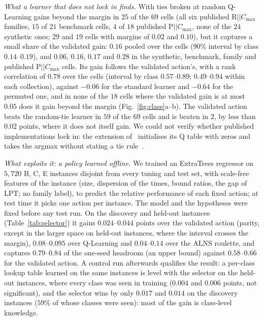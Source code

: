 \documentclass[conference,a4paper]{IEEEtran}
\newcommand{\Cmax}{C_{\max}}
\begin{document}
\emph{What a learner that does not lock in finds.} With ties broken at random Q-Learning gains beyond the margin in $25$ of the $69$ cells (all six published R$||\Cmax$ families, $15$ of $21$ benchmark cells, $4$ of $18$ published P$||\Cmax$, none of the $24$ synthetic ones; $29$ and $19$ cells with margins of $0.02$ and $0.10$), but it captures a small share of the validated gain: $0.16$ pooled over the cells (90\% interval by class $0.14$--$0.19$), and $0.06$, $0.16$, $0.17$ and $0.28$ in the synthetic, benchmark, family and published P$||\Cmax$ cells.
Its gain follows the validated action's, with a rank correlation of $0.78$ over the cells (interval by class $0.57$--$0.89$; $0.49$--$0.94$ within each collection), against $-0.06$ for the standard learner and $-0.64$ for the permuted one, and in none of the $18$ cells where the validated gain is at most $0.05$ does it gain beyond the margin (Fig.~\ref{fig:class}a--b).
The validated action beats the random-tie learner in $59$ of the $69$ cells and is beaten in $2$, by less than $0.02$ points, where it does not itself gain. We could not verify whether published implementations lock in: the extension of~\cite{KarimiMamaghanEtal2023} initialises its Q table with zeros and takes the argmax without stating a tie rule~\cite{KarimiMamaghanEtal2024}.

\emph{What exploits it: a policy learned offline.} We trained an ExtraTrees regressor on $5{,}720$ B, C, E instances disjoint from every tuning and test set, with scale-free features of the instance (size, dispersion of the times, bound ratios, the gap of LPT; no family label), to predict the relative performance of each fixed action; at test time it picks one action per instance. The model and the hypotheses were fixed before any test run.
On the discovery and held-out instances (Table~\ref{tab:selector}) it gains $0.024$--$0.044$ points over the validated action (parity, except in the larger space on held-out instances, where the interval crosses the margin), $0.08$--$0.095$ over Q-Learning and $0.04$--$0.14$ over the ALNS roulette, and captures $0.79$--$0.84$ of the one-seed headroom (an upper bound) against $0.58$--$0.66$ for the validated action.
A control run afterwards qualifies the result: a per-class lookup table learned on the same instances is level with the selector on the held-out instances, where every class was seen in training ($0.004$ and $0.006$ points, not significant), and the selector wins by only $0.017$ and $0.014$ on the discovery instances ($59\%$ of whose classes were seen): most of the gain is class-level knowledge.
\end{document}
